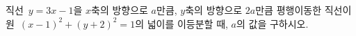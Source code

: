 직선~$y=3x-1$을 $x$축의 방향으로 $a$만큼, $y$축의 방향으로 $2a$만큼 평행이동한 직선이 원~$(x-1)^2+(y+2)^2=1$의 넓이를 이등분할 때, $a$의 값을 구하시오.
